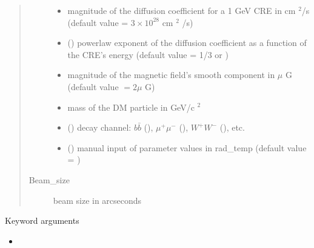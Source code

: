 \documentclass[letterpaper,10pt,english]{sphinxmanual}
\begin{document}
\begin{fulllineitems}
\begin{quote}
\begin{description}
\begin{itemize}
\item {} 
\sphinxAtStartPar
{} \textendash{} magnitude of the diffusion coefficient for a 1 GeV CRE in cm \({}^2\)/s (default value = \(3\times 10^{28}\) cm \({}^2\) /s)

\item {} 
\sphinxAtStartPar
{} (\sphinxstyleliteralemphasis{\sphinxupquote{, }}) \textendash{} power\sphinxhyphen{}law exponent of the diffusion coefficient as a function of the CRE’s energy (default value = 1/3 or )

\item {} 
\sphinxAtStartPar
{} \textendash{} magnitude of the magnetic field’s smooth component in \(\mu\) G (default value \(= 2 \mu\) G)

\item {} 
\sphinxAtStartPar
{} \textendash{} mass of the DM particle in GeV/c \({}^2\)

\item {} 
\sphinxAtStartPar
{} () \textendash{} decay channel: \(b\bar b\) (), \(\mu^+ \mu^-\) (), \(W^+ W^-\) (), etc.

\item {} 
\sphinxAtStartPar
{} () \textendash{} manual input of parameter values in rad\_temp (default value = )

\end{itemize}

\item[{Beam\_size}] \leavevmode
\sphinxAtStartPar
beam size in arcseconds

\end{description}\end{quote}

\sphinxAtStartPar
Keyword arguments
\begin{itemize}
\item {} 
\sphinxAtStartPar
{}


\end{itemize}
\end{fulllineitems}
\end{document}
